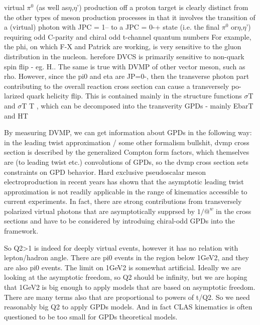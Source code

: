                     virtual $\pi^0$ (as well as$\eta$,$\eta$') production off a proton target is clearly distinct from the other
            types of meson production processes in that it involves the transition of a (virtual) photon
            with JPC = 1– to a JPC = 0-+ state (i.e. the final $\pi^0$ or$\eta$,$\eta$’) requiring odd C-parity and
            chiral odd t-channel quantum numbers
For example, the phi, on which F-X and Patrick are
            working, is very sensitive to the gluon distribution in the nucleon.
herefore DVCS is
            primarily sensitive to non-quark spin flip - eg. H.. The same is true with DVMP of other
            vector meson, such as rho. However, since the pi0 and eta are JP=0-, then the transverse
            photon part contributing to the overall reaction cross section can cause a transversely po-
            larized quark helicity flip. This is contained mainly in the structure functions $\sigma$T and $\sigma$T T ,
            which can be decomposed into the transverity GPDs - mainly EbarT and HT


      By measuring DVMP, we can get information about GPDs in the following way: in the leading twist approximation / some other formalism bullshit, dvmp cross section is described by the generalized Compton form factors, which themselves are (to leading twist etc.) convolutions of GPDs, so the dvmp cross section sets constraints on GPD behavior. Hard exclusive pseudoscalar meson electroproduction in recent years has shown that the asymptotic leading twist approximation is not readily applicable in the range of kinematics accessible to current experiments. In fact, there are strong contributions from transversely polarized virtual photons that are asymptotically supprsed by $1/@^w$ in the cross sections and have to be considered by introduing chiral-odd GPDs into the framework.   
        
        So Q2>1 is indeed for deeply virtual events, however it has no relation with lepton/hadron angle. There are pi0 events in the region below 1GeV2, and they are also pi0 events. The limit on 1GeV2 is somewhat artificial. Ideally we are looking at the asymptotic freedom, so Q2 should be infinity, but we are hoping that 1GeV2 is big enough to apply models that are based on asymptotic freedom. There are many terms also that are proportional to powers of t/Q2. So we need reasonably big Q2 to apply GPDs models. And in fact CLAS kinematics is often questioned to be too small for GPDs theoretical models.
        
